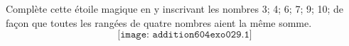 Complète cette étoile magique en y inscrivant les nombres 3; 4; 6; 7;
9; 10; de façon que toutes les rangées de quatre nombres aient la même
somme.
\[\texttt{[image: addition604exo029.1]}\]
